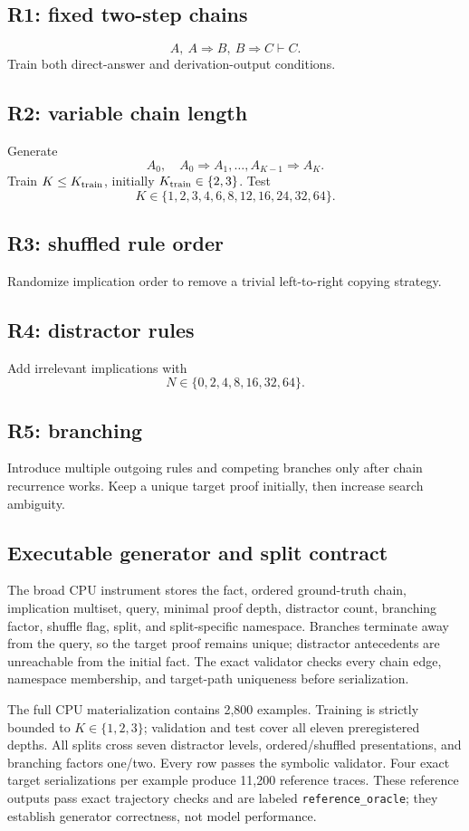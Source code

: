 \documentclass[10pt]{article}
\begin{document}
\subsection{R1: fixed two-step chains}
\[
A,\ A\Rightarrow B,\ B\Rightarrow C\vdash C.
\]
Train both direct-answer and derivation-output conditions.

\subsection{R2: variable chain length}
Generate
\[
A_0,\quad A_0\Rightarrow A_1,\ldots,A_{K-1}\Rightarrow A_K.
\]
Train $K\le K_{\rm train}$, initially $K_{\rm train}\in\{2,3\}$. Test
\[
K\in\{1,2,3,4,6,8,12,16,24,32,64\}.
\]

\subsection{R3: shuffled rule order}
Randomize implication order to remove a trivial left-to-right copying strategy.

\subsection{R4: distractor rules}
Add irrelevant implications with
\[
N\in\{0,2,4,8,16,32,64\}.
\]

\subsection{R5: branching}
Introduce multiple outgoing rules and competing branches only after chain recurrence works. Keep a unique target proof initially, then increase search ambiguity.

\subsection{Executable generator and split contract}
The broad CPU instrument stores the fact, ordered ground-truth chain, implication multiset, query, minimal proof depth, distractor count, branching factor, shuffle flag, split, and split-specific namespace. Branches terminate away from the query, so the target proof remains unique; distractor antecedents are unreachable from the initial fact. The exact validator checks every chain edge, namespace membership, and target-path uniqueness before serialization.

The full CPU materialization contains 2,800 examples. Training is strictly bounded to $K\in\{1,2,3\}$; validation and test cover all eleven preregistered depths. All splits cross seven distractor levels, ordered/shuffled presentations, and branching factors one/two. Every row passes the symbolic validator. Four exact target serializations per example produce 11,200 reference traces. These reference outputs pass exact trajectory checks and are labeled \texttt{reference\_oracle}; they establish generator correctness, not model performance.
\end{document}
